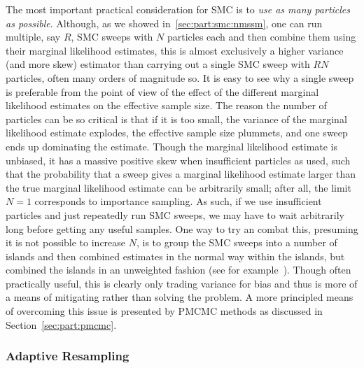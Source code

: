 The most important practical consideration for SMC is to
\emph{use as many particles as possible}.  Although, as we showed in~\ref{sec:part:smc:nmssm},
one can run multiple, say $R$, SMC sweeps with $N$ particles each and then combine them using their marginal likelihood estimates, this
is almost exclusively a higher variance (and more skew) estimator than carrying out a single SMC sweep
with $RN$ particles, often many orders of magnitude so.  It is easy to see why a single sweep is preferable
from the point of view of the effect of the different marginal likelihood estimates on the effective sample size.
The reason the number of particles can be so critical is that if it is too small, the variance of the marginal likelihood
estimate explodes, the effective sample size plummets, and one sweep ends up dominating the estimate.  Though the marginal 
likelihood estimate is unbiased, it has a massive positive skew when insufficient particles as used, such that the 
probability that a
sweep gives a marginal likelihood estimate larger than the true marginal likelihood estimate can be arbitrarily small;
after all, the limit $N=1$ corresponds to importance sampling.  As such, if we use insufficient particles and just
repeatedly run SMC sweeps, we may have to wait arbitrarily long before getting any useful samples.  One way 
to try an combat this, presuming it is not possible to increase $N$, is to group the SMC sweeps into a number
of islands and then combined estimates in the normal way within the islands, but combined the islands in
an unweighted fashion (see for example~\cite{lakshminarayanan2013top}).  Though often practically useful, this
is clearly only trading variance for bias and thus is more of a means of mitigating rather than solving the problem.
A more principled means of overcoming this issue is presented by PMCMC methods as discussed in Section~\ref{sec:part:pmcmc}.

\subsubsection{Adaptive Resampling}
\label{sec:part:smc:prat:ad-re}

